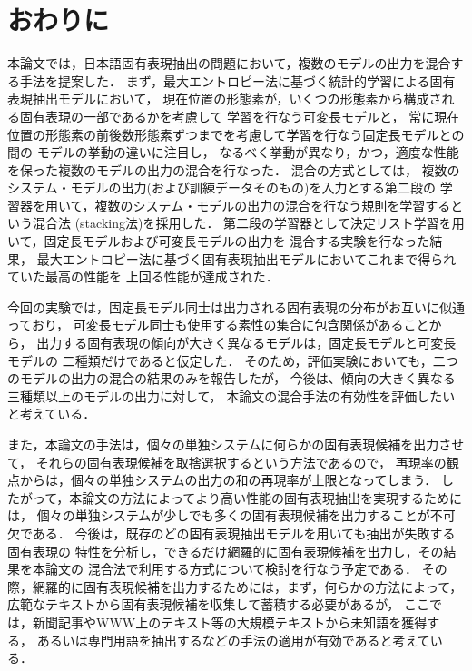 \section{おわりに}
\label{sec:conc}

本論文では，日本語固有表現抽出の問題において，複数のモデルの出力を混合する手法を提案した．
まず，最大エントロピー法に基づく統計的学習による固有表現抽出モデルにおいて，
現在位置の形態素が，いくつの形態素から構成される固有表現の一部であるかを考慮して
学習を行なう可変長モデルと，
常に現在位置の形態素の前後数形態素ずつまでを考慮して学習を行なう固定長モデルとの間の
モデルの挙動の違いに注目し，
なるべく挙動が異なり，かつ，適度な性能を保った複数のモデルの出力の混合を行なった．
混合の方式としては，
複数のシステム・モデルの出力(および訓練データそのもの)を入力とする第二段の
学習器を用いて，複数のシステム・モデルの出力の混合を行なう規則を学習するという混合法
(stacking法)を採用した．
第二段の学習器として決定リスト学習を用いて，固定長モデルおよび可変長モデルの出力を
混合する実験を行なった結果，
最大エントロピー法に基づく固有表現抽出モデルにおいてこれまで得られていた最高の性能を
上回る性能が達成された．

今回の実験では，固定長モデル同士は出力される固有表現の分布がお互いに似通っており，
可変長モデル同士も使用する素性の集合に包含関係があることから，
出力する固有表現の傾向が大きく異なるモデルは，固定長モデルと可変長モデルの
二種類だけであると仮定した．
そのため，評価実験においても，二つのモデルの出力の混合の結果のみを報告したが，
今後は、傾向の大きく異なる三種類以上のモデルの出力に対して，
本論文の混合手法の有効性を評価したいと考えている．

また，本論文の手法は，個々の単独システムに何らかの固有表現候補を出力させて，
それらの固有表現候補を取捨選択するという方法であるので，
再現率の観点からは，個々の単独システムの出力の和の再現率が上限となってしまう．
したがって，本論文の方法によってより高い性能の固有表現抽出を実現するためには，
個々の単独システムが少しでも多くの固有表現候補を出力することが不可欠である．
今後は，既存のどの固有表現抽出モデルを用いても抽出が失敗する固有表現の
特性を分析し，できるだけ網羅的に固有表現候補を出力し，その結果を本論文の
混合法で利用する方式について検討を行なう予定である．
その際，網羅的に固有表現候補を出力するためには，まず，何らかの方法によって，
広範なテキストから固有表現候補を収集して蓄積する必要があるが，
ここでは，新聞記事やWWW上のテキスト等の大規模テキストから未知語を獲得する，
あるいは専門用語を抽出するなどの手法の適用が有効であると考えている．






